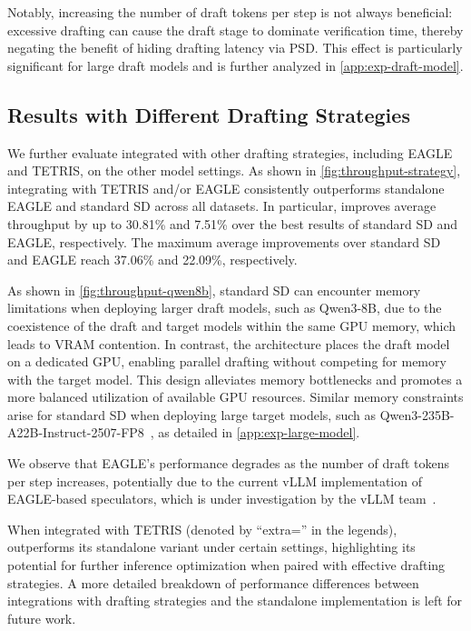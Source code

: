 Notably, increasing the number of draft tokens per step is not always beneficial: excessive drafting can cause the draft stage to dominate verification time, thereby negating the benefit of hiding drafting latency via PSD. This effect is particularly significant for large draft models and is further analyzed in \cref{app:exp-draft-model}.


\subsection{Results with Different Drafting Strategies}
\label{ssec:Drafting_Strategies}
We further evaluate \alg{} integrated with other drafting strategies, including EAGLE and TETRIS, on the other model settings. As shown in \cref{fig:throughput-strategy}, integrating \alg{} with TETRIS and/or EAGLE consistently outperforms standalone EAGLE and standard SD across all datasets. In particular, \alg{} improves average throughput by up to 30.81\% and 7.51\% over the best results of standard SD and EAGLE, respectively. The maximum average improvements over standard SD and EAGLE reach 37.06\% and 22.09\%, respectively.

As shown in \cref{fig:throughput-qwen8b}, standard SD can encounter memory limitations when deploying larger draft models, such as Qwen3-8B, due to the coexistence of the draft and target models within the same GPU memory, which leads to VRAM contention. In contrast, the \alg{} architecture places the draft model on a dedicated GPU, enabling parallel drafting without competing for memory with the target model. This design alleviates memory bottlenecks and promotes a more balanced utilization of available GPU resources. Similar memory constraints arise for standard SD when deploying large target models, such as Qwen3-235B-A22B-Instruct-2507-FP8~\citep{qwen3technicalreport}, as detailed in \cref{app:exp-large-model}.


We observe that EAGLE’s performance degrades as the number of draft tokens per step increases, potentially due to the current vLLM implementation of EAGLE-based speculators, which is under investigation by the vLLM team~\citep{vllm_eagle_issue}.


When integrated with TETRIS (denoted by ``extra='' in the legends), \alg{} outperforms its standalone variant under certain settings, highlighting its potential for further inference optimization when paired with effective drafting strategies. A more detailed breakdown of performance differences between integrations with drafting strategies and the standalone \alg{} implementation is left for future work.


